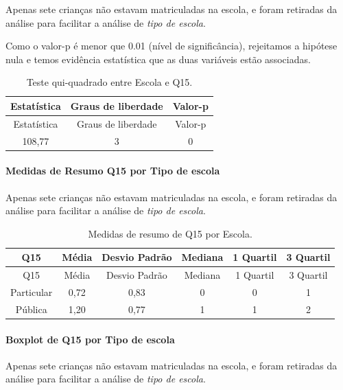 \documentclass[]{article}
\let\oldparagraph\paragraph
\renewcommand{\paragraph}[1]{\oldparagraph{#1}\mbox{}}
\begin{document}
Apenas sete crianças não estavam matriculadas na escola, e foram retiradas da análise para facilitar a análise de \emph{tipo de escola}.

Como o valor-p é menor que 0.01 (nível de significância), rejeitamos a hipótese nula e temos evidência estatística que as duas variáveis estão associadas.

\begin{longtable}[]{@{}ccc@{}}
\caption{\label{tab:unnamed-chunk-114}Teste qui-quadrado entre Escola e Q15.}\tabularnewline
\toprule
Estatística & Graus de liberdade & Valor-p\tabularnewline
\midrule
\endfirsthead
\toprule
Estatística & Graus de liberdade & Valor-p\tabularnewline
\midrule
\endhead
108,77 & 3 & 0\tabularnewline
\bottomrule
\end{longtable}

\cleardoublepage

\hypertarget{medidas-de-resumo-q15-por-tipo-de-escola}{%
\paragraph{Medidas de Resumo Q15 por Tipo de escola}\label{medidas-de-resumo-q15-por-tipo-de-escola}}

Apenas sete crianças não estavam matriculadas na escola, e foram retiradas da análise para facilitar a análise de \emph{tipo de escola}.

\begin{longtable}[]{@{}cccccc@{}}
\caption{\label{tab:unnamed-chunk-115}Medidas de resumo de Q15 por Escola.}\tabularnewline
\toprule
Q15 & Média & Desvio Padrão & Mediana & 1 Quartil & 3 Quartil\tabularnewline
\midrule
\endfirsthead
\toprule
Q15 & Média & Desvio Padrão & Mediana & 1 Quartil & 3 Quartil\tabularnewline
\midrule
\endhead
Particular & 0,72 & 0,83 & 0 & 0 & 1\tabularnewline
Pública & 1,20 & 0,77 & 1 & 1 & 2\tabularnewline
\bottomrule
\end{longtable}

\hypertarget{boxplot-de-q15-por-tipo-de-escola}{%
\paragraph{Boxplot de Q15 por Tipo de escola}\label{boxplot-de-q15-por-tipo-de-escola}}

Apenas sete crianças não estavam matriculadas na escola, e foram retiradas da análise para facilitar a análise de \emph{tipo de escola}.
\end{document}
